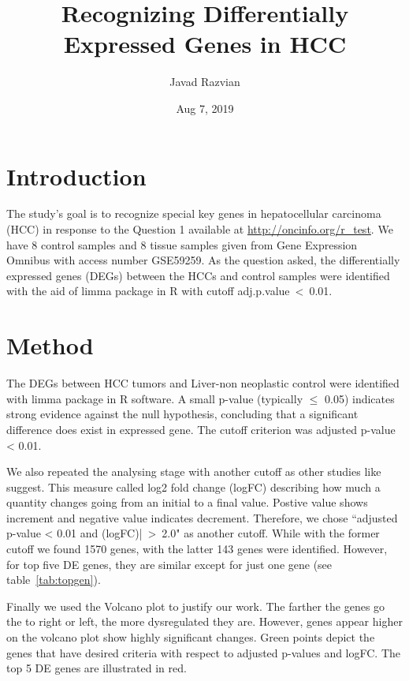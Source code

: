 \documentclass[12pt, ]{article}
\title{Recognizing Differentially Expressed Genes in HCC}
\author{Javad Razvian}
\date{Aug 7, 2019}
\begin{document}
\maketitle

\section{Introduction}
The study's goal is to recognize special key genes in hepatocellular carcinoma (HCC) in response to the Question 1 available at \url{http://oncinfo.org/r_test}.
We have 8 control samples and 8 tissue samples given from Gene Expression Omnibus with access number GSE59259.
As the question asked, the differentially expressed genes (DEGs) between the HCCs and control samples were identified with the aid of limma
package in R with cutoff  adj.p.value~<~0.01. 

\section{Method}

The DEGs between HCC tumors and Liver-non neoplastic control were identified with 
limma \cite{bib:limma} package in R software. 
A small p-value (typically $\leq$ 0.05) indicates strong evidence against the null hypothesis, concluding that a significant difference does exist in expressed gene. The cutoff criterion was adjusted p-value < 0.01. 

We also repeated the analysing stage with another cutoff as other studies like \cite{bib:skg} suggest. This measure called log2 fold change (logFC) describing how much a quantity changes going from an initial to a final value. Postive value shows increment and negative value indicates decrement.
Therefore, we chose ``adjusted p-value < 0.01 and (logFC)|~>~2.0" as another cutoff.
While with the former cutoff we found 1570 genes, with the latter 143 genes were identified. However, for top five DE genes, they are similar except for just 
one gene (see table~\ref{tab:topgen}).

Finally we used the Volcano plot to justify our work. The farther the genes go the to right or left, the more dysregulated they are. However, genes appear higher on the volcano plot show highly significant changes. Green points depict the genes that have desired criteria with respect to 
adjusted p-values and logFC. 
The top 5 DE genes are illustrated in red. 
\end{document}
